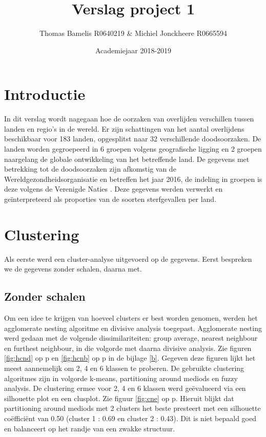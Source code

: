 \documentclass[a4paper,kulak]{kulakarticle}
\date{Academiejaar 2018-2019}
\title{Verslag project 1}
\author{Thomas Bamelis R0640219 \& Michiel Jonckheere R0665594}
\begin{document}
\maketitle

\tableofcontents
\newpage
\section*{Introductie}
In dit verslag wordt nagegaan hoe de oorzaken van overlijden verschillen tussen landen en regio's in
de wereld. Er zijn schattingen van het aantal overlijdens beschikbaar voor 183 landen,
opgesplitst naar 32 verschillende doodsoorzaken. De landen worden gegroepeerd in 6 groepen volgens
geografische ligging en 2 groepen naargelang de globale ontwikkeling van het betreffende land. De gegevens
met betrekking tot de doodsoorzaken zijn afkomstig van de Wereldgezondheidsorganisatie \cite{ghe} en betreffen
het jaar 2016, de indeling in groepen is deze volgens de Verenigde Naties \cite{vn}. 
Deze gegevens werden verwerkt en geïnterpreteerd als proporties van de soorten sterfgevallen per land.

\section{Clustering}
Als eerste werd een cluster-analyse uitgevoerd op de gegevens. Eerst bespreken we de gegevens zonder schalen, daarna met.
\subsection{Zonder schalen}
Om een idee te krijgen van hoeveel clusters er best worden genomen, werden het agglomerate nesting algoritme en divisive analysis toegepast.
Agglomerate nesting werd gedaan met de volgende dissimilariteiten: group average, nearest neighbour en furthest neighbour, in die volgorde met daarna divisive analysis.
Zie figuren \ref{fig:hcnd} op p\pageref{fig:hcnd} en \ref{fig:hcnb} op p\pageref{fig:hcnb} in de bijlage \ref{b}.
Gegeven deze figuren lijkt het meest aannemelijk om 2, 4 en 6 klassen te proberen.
De gebruikte clustering algoritmes zijn in volgorde k-means, partitioning around mediods en fuzzy analysis.
De clustering ermee voor 2, 4 en 6 klassen werd geëvalueerd via een silhouette plot en een clusplot.
Zie figuur \ref{fig:cne} op p\pageref{fig:cne}.
Hieruit blijkt dat partitioning around mediods met 2 clusters het beste presteert met een silhouette coëfficiënt van 0.50 (cluster 1 : 0.69 en cluster 2 : 0.43).
Dit is niet bepaald goed en balanceert op het randje van een zwakke structuur.
\end{document}
